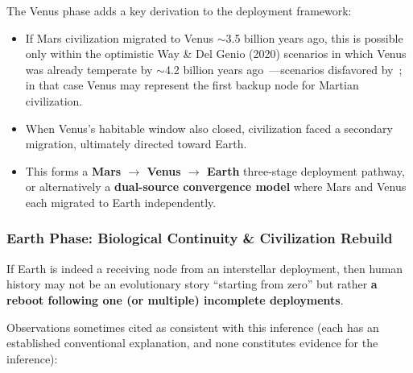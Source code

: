 \documentclass[aps,prd,twocolumn,superscriptaddress,nofootinbib]{revtex4-2}
\begin{document}
The Venus phase adds a key derivation to the deployment framework:

\begin{itemize}
  \item If Mars civilization migrated to Venus ${\sim}$3.5 billion years ago, this is possible only within the optimistic Way \& Del Genio (2020) scenarios in which Venus was already temperate by ${\sim}$4.2 billion years ago~\cite{Way2020}---scenarios disfavored by~\cite{Constantinou2024,Turbet2021,Warren2023}; in that case Venus may represent the first backup node for Martian civilization.
  \item When Venus's habitable window also closed, civilization faced a secondary migration, ultimately directed toward Earth.
  \item This forms a \textbf{Mars $\to$ Venus $\to$ Earth} three-stage deployment pathway, or alternatively a \textbf{dual-source convergence model} where Mars and Venus each migrated to Earth independently.
\end{itemize}

\subsubsection{Earth Phase: Biological Continuity \& Civilization Rebuild}\label{sec:earth-phase}

If Earth is indeed a receiving node from an interstellar deployment, then human history may not be an evolutionary story ``starting from zero'' but rather \textbf{a reboot following one (or multiple) incomplete deployments}.

Observations sometimes cited as consistent with this inference (each has an established conventional explanation, and none constitutes evidence for the inference):
\end{document}
